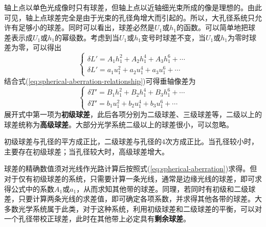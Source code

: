 \documentclass[cn,10pt,chinesefont=founder,math=newtx,cite=super,twoside]{elegantbook}
\begin{document}
轴上点以单色光成像时只有球差，但轴上点以近轴细光束所成的像是理想的。由此可见，轴上点球差完全是由于光束的孔径角增大而引起的。所以，大孔径系统只允许有足够小的球差。同时可以看出，球差必然是$U_1$或$h_1$的函数。可以简单地把球差表示成$U_1$或$h_1$的幂级数。考虑到当$U_1$或$h_1$变号时球差不变，当$U_1$或$h_1$为零时球差为零，可以得出
\begin{equation}
\begin{cases}
\delta L'=A_1h^2_1+A_2h^4_1+A_3h^6_1+\cdots\\
\delta L'=a_1u^2_1+a_2u^4_1+a_3u^6_1+\cdots
\end{cases}
\end{equation}
结合式(\ref{eq:spherical-aberration-relationship})可得垂轴像差为
\begin{equation}
\begin{cases}
\delta T'=B_1h^2_1+B_2h^4_1+B_3h^6_1+\cdots\\
\delta T'=b_1u^2_1+b_2u^4_1+b_3u^6_1+\cdots
\end{cases}
\end{equation}
展开式中第一项为\textbf{初级球差}，此后各项分别为二级球差、三级球差等，二级以上的球差统称为\textbf{高级球差}。大部分光学系统二级以上的球差很小，可以忽略。
\begin{property}
	初级球差与孔径的平方成正比，二级球差与孔径的$4$次方成正比。当孔径较小时，主要存在初级球差；当孔径较大时，高级球差增大。	
\end{property}

球差的精确数值须对光线作光路计算后按照式(\ref{eq:spherical-aberration})求得。但对于仅有初级球差的系统，只需要计算一条光线，通常是边缘光线的球差，即可求得公式中的系数$A_1$或$a_1$，从而求知其他带的球差。同理，若同时有初级和二级球差，只要计算两条光线的求差值，即可确定各项系数，并求得其他各带的球差。大多数光学系统属于此类，对于这种系统，利用初级球差和二级球差的平衡，可以对一个孔径带校正球差，此时在其他带上必定具有\textbf{剩余球差}。
\end{document}
